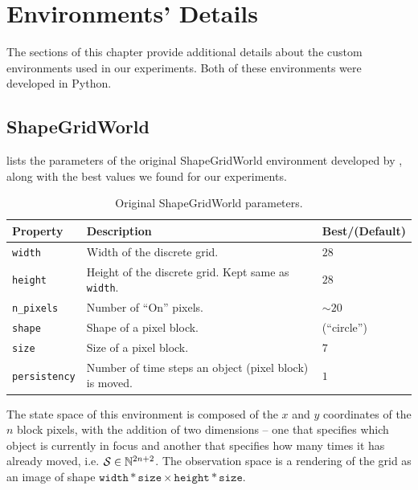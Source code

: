 \makeatletter
{}
\makeatother
{}

\chapter{Environments' Details}
\label{sec:environments-details}
The sections of this chapter provide additional details about the custom environments used in our experiments.
Both of these environments were developed in Python.

\section{ShapeGridWorld}
\label{sec:sgw-details}
 lists the parameters of the original ShapeGridWorld environment developed by \cite{rair}, along with the best values we found for our experiments.
\begin{table}[H]
    \centering
    \caption{Original ShapeGridWorld parameters.}
    \begin{tabularx}{\textwidth}{C{3.9cm} L C{2cm}}
        \hline
        Property & Description & Best/(Default)\\
        \hline
        \texttt{width} & Width of the discrete grid. & \(28\)\\
        \texttt{height} & Height of the discrete grid. Kept same as \texttt{width}. & \(28\)\\
        \texttt{n\_pixels} & Number of ``On'' pixels. & \(\sim 20\)\\
        \texttt{shape} & Shape of a pixel block. & (``circle'')\\
        \texttt{size} & Size of a pixel block. & \(7\)\\
        \texttt{persistency} & Number of time steps an object (pixel block) is moved. & \(1\)\\
        \hline
    \end{tabularx}
    \label{tab:original-sgw-params}
\end{table}
The state space of this environment is composed of the \(x\) and \(y\) coordinates of the \(n\) block pixels, with the addition of two dimensions -- one that specifies which object is currently in focus and another that specifies how many times it has already moved, i.e. \(\mathcal{S} \in \mathbb{N}^{2 n + 2}\).
The observation space is a rendering of the grid as an image of shape \(\texttt{width} * \texttt{size} \times \texttt{height} * \texttt{size}\).


